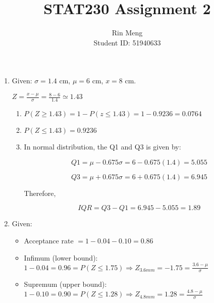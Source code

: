 \documentclass[12pt]{article}
\begin{document}
\title{STAT230 Assignment 2}
\author{Rin Meng \\ Student ID: 51940633}
\maketitle

\begin{enumerate}
	\item Given: $\sigma = 1.4$ cm, $\mu = 6$ cm, $x = 8$ cm.
		
		$Z = \frac{x - \mu}{\sigma} = \frac{8 - 6}{1.4} \simeq 1.43$ 
		\begin{enumerate}
			\item $P(Z \geq 1.43) = 1 - P(z \leq 1.43) = 1 - 0.9236 = 0.0764$
			\item $P(Z \leq 1.43) = 0.9236$
			\item In normal distribution, the Q1 and Q3 is given by:
			
			$$Q1 = \mu - 0.675 \sigma = 6 - 0.675(1.4) = 5.055$$
			
			$$Q3 = \mu + 0.675 \sigma = 6 + 0.675(1.4) = 6.945$$
			
			Therefore,
			
			$$IQR = Q3 - Q1 = 6.945 - 5.055 = 1.89$$
			
		\end{enumerate}
	\item Given: 
		\begin{itemize}
			\item Acceptance rate $= 1 - 0.04 - 0.10 = 0.86$
			\item Infimum (lower bound): $1 - 0.04 = 0.96 = P(Z \leq 1.75) \Rightarrow Z_{3.6mm} = -1.75 = \frac{3.6 - \mu}{\sigma}$
			\item Supremum (upper bound): $1 - 0.10 = 0.90 = P(Z \leq 1.28) \Rightarrow Z_{4.8mm} = 1.28 = \frac{4.8 - \mu}{\sigma}$
		\end{itemize}
		

\end{enumerate}
\end{document}
